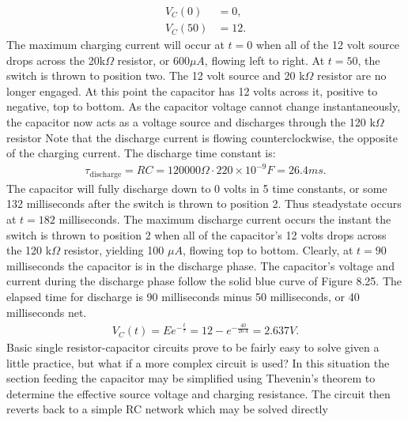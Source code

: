 \documentclass{report}
\begin{document}
\begin{itemize}
\begin{align*}
                V_{C}(0) &= 0,\\
                V_{C}(50) &= 12
            .\end{align*}
            The maximum charging current will occur at $t=0$ when all of the 12 volt source drops across the 20k$\Omega$ resistor, or 600$\mu A$, flowing left to right.
            \bigbreak \noindent 
            At $t=50$, the switch is thrown to position two. The 12 volt source and 20 k$\Omega$ resistor are no longer engaged. At this point the capacitor has 12 volts across it, positive to negative, top to bottom. As the capacitor voltage cannot change instantaneously, the capacitor now acts as a voltage source and discharges through the 120 k$\Omega$ resistor
            \bigbreak \noindent 
            Note that the discharge current is flowing counterclockwise, the opposite of the charging current. The discharge time constant is:
            \begin{align*}
                \tau_{\text{discharge}} = RC = 120000 \Omega \cdot 220 \times 10^{-9}F = 26.4ms
            .\end{align*}
            The capacitor will fully discharge down to 0 volts in 5 time constants, or some 132 milliseconds after the switch is thrown to position 2.
            \bigbreak \noindent 
            Thus steadystate occurs at $t = 182$ milliseconds. The maximum discharge current occurs the instant the switch is thrown to position 2 when all of the capacitor's 12 volts drops across the 120 k$\Omega$ resistor, yielding 100 $\mu A$, flowing top to bottom.
            \bigbreak \noindent 
            Clearly, at $t = 90$ milliseconds the capacitor is in the discharge phase. The capacitor's voltage and current during the discharge phase follow the solid blue curve of Figure 8.25. The elapsed time for discharge is 90 milliseconds minus 50 milliseconds, or 40 milliseconds net.
            \begin{align*}
                V_{C}(t) = Ee^{-\frac{t}{\tau}} = 12 - e^{-\frac{40}{26.4}} = 2.637V
            .\end{align*}
            \bigbreak \noindent 
            Basic single resistor-capacitor circuits prove to be fairly easy to solve given a little practice, but what if a more complex circuit is used? In this situation the section feeding the capacitor may be simplified using Thevenin's theorem to determine the effective source voltage and charging resistance. The circuit then reverts back to a simple RC network which may be solved directly
            \bigbreak \noindent 

\end{itemize}
\end{document}
